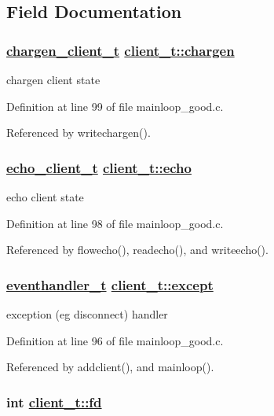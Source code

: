 \subsection{Field Documentation}
\hypertarget{structclient__t_o5}{
\subsubsection[chargen]{\setlength{\rightskip}{0pt plus 5cm}\hyperlink{structchargen__client__t}{chargen\_\-client\_\-t} \hyperlink{structclient__t_o5}{client\_\-t::chargen}}}
\label{structclient__t_o5}


chargen client state 



Definition at line 99 of file mainloop\_\-good.c.

Referenced by writechargen().\hypertarget{structclient__t_o4}{
\subsubsection[echo]{\setlength{\rightskip}{0pt plus 5cm}\hyperlink{structecho__client__t}{echo\_\-client\_\-t} \hyperlink{structclient__t_o4}{client\_\-t::echo}}}
\label{structclient__t_o4}


echo client state 



Definition at line 98 of file mainloop\_\-good.c.

Referenced by flowecho(), readecho(), and writeecho().\hypertarget{structclient__t_o3}{
\subsubsection[except]{\setlength{\rightskip}{0pt plus 5cm}\hyperlink{mainloop__good_8c_a20}{eventhandler\_\-t} \hyperlink{structclient__t_o3}{client\_\-t::except}}}
\label{structclient__t_o3}


exception (eg disconnect) handler 



Definition at line 96 of file mainloop\_\-good.c.

Referenced by addclient(), and mainloop().\hypertarget{structclient__t_o0}{
\subsubsection[fd]{\setlength{\rightskip}{0pt plus 5cm}int \hyperlink{structclient__t_o0}{client\_\-t::fd}}}
\label{structclient__t_o0}


